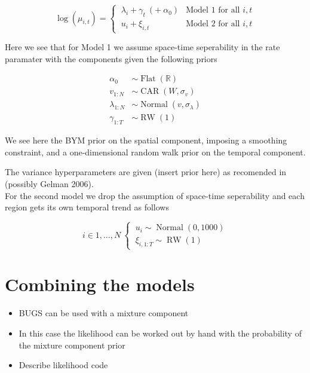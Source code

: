 \documentclass[11pt]{report}
\begin{document}
\begin{equation}
\log{(\mu_{i,t})} = \begin{cases}
\ \lambda_{i} + \gamma_{t} \  (+ \  \alpha_0) & \textrm{Model 1 for all } i, t \\
\ u_{i} + \xi_{i,t} & \textrm{Model 2 for all } i, t
\end{cases}
\end{equation} 

Here we see that for Model 1 we assume space-time seperability in the rate paramater with the components given the following priors

\begin{align}
\alpha_0 &\sim \operatorname{Flat}(\mathbb{R}) \\
v_{1:N} &\sim \operatorname{CAR}(W, \sigma_v) \\
\lambda_{1:N} &\sim \operatorname{Normal}(v, \sigma_\lambda) \\
\gamma_{1:T} &\sim \operatorname{RW}(1)
\end{align}

We see here the BYM prior on the spatial component, imposing a smoothing constraint, and a one-dimensional random walk prior on the temporal component. 

The variance hyperparameters are given (insert prior here) as recomended in (possibly Gelman 2006). \\

For the second model we drop the assumption of space-time seperability and each region gets its own temporal trend as follows

\begin{equation}
i \in 1,\ldots,N \
\begin{cases}
\ u_i \sim \operatorname{Normal}(0, 1000) \\
\ \xi_{i, 1:T} \sim \operatorname{RW}(1) 
\end{cases}
\end{equation}

\section{Combining the models}

\begin{itemize}
\item BUGS can be used with a mixture component
\item In this case the likelihood can be worked out by hand with the probability of the mixture component prior
\item Describe likelihood code
\end{itemize}
\end{document}
